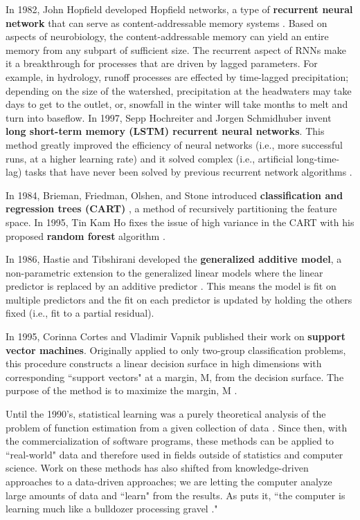 In 1982, John Hopfield developed Hopfield networks, a type of \textbf{recurrent neural network} that can serve as content-addressable memory systems \cite{hopfield1982neural}. Based on aspects of neurobiology, the content-addressable memory can yield an entire memory from any subpart of sufficient size. The recurrent aspect of RNNs make it a breakthrough for processes that are driven by lagged parameters. For example, in hydrology, runoff processes are effected by time-lagged precipitation; depending on the size of the watershed, precipitation at the headwaters may take days to get to the outlet, or, snowfall in the winter will take months to melt and turn into baseflow. In 1997, Sepp Hochreiter and Jorgen Schmidhuber invent \textbf{long short-term memory (LSTM) recurrent neural networks}. This method greatly improved the efficiency of neural networks (i.e., more successful runs, at a higher learning rate) and it solved complex (i.e., artificial long-time-lag) tasks that have never been solved by previous recurrent network algorithms \cite{hochreiter1997long}. 

In 1984, Brieman, Friedman, Olshen, and Stone introduced \textbf{classification and regression trees (CART)} \cite{breiman1993classification}, a method of recursively partitioning the feature space. In 1995, Tin Kam Ho fixes the issue of high variance in the CART with his proposed \textbf{random forest} algorithm \cite{ho1995random}. 

In 1986, Hastie and Tibshirani developed the \textbf{generalized additive model}, a non-parametric extension to the generalized linear models where the linear predictor is replaced by an additive predictor \cite{hastie1990generalized}. This means the model is fit on multiple predictors and the fit on each predictor is updated by holding the others fixed (i.e., fit to a partial residual). 

In 1995, Corinna Cortes and Vladimir Vapnik published their work on \textbf{support vector machines}. Originally applied to only two-group classification problems, this procedure constructs a linear decision surface in high dimensions with corresponding ``support vectors" at a margin, M, from the decision surface. The purpose of the method is to maximize the margin, M \cite{cortes1995support}. 

Until the 1990's, statistical learning was a purely theoretical analysis of the problem of function estimation from a given collection of data \cite{vapnik1999overview}. Since then, with the commercialization of software programs, these methods can be applied to ``real-world" data and therefore used in fields outside of statistics and computer science. Work on these methods has also shifted from knowledge-driven approaches to a data-driven approaches; we are letting the computer analyze large amounts of data and ``learn" from the results. As  puts it, ``the computer is learning much like a bulldozer processing gravel \cite{winston2010class}."

